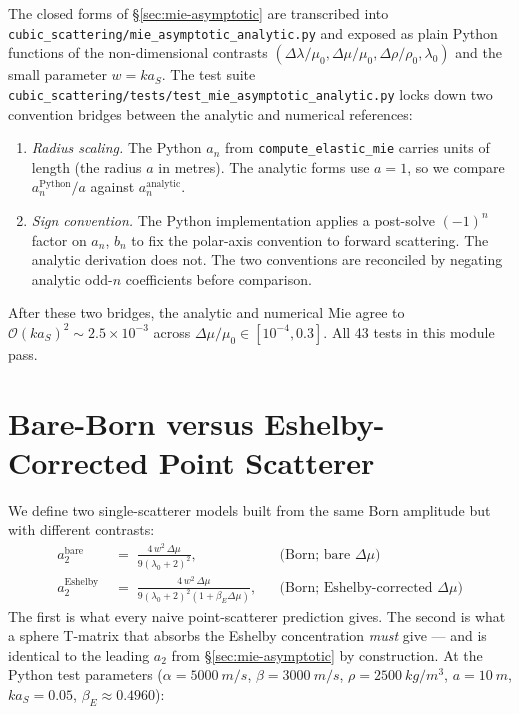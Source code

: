 \documentclass[11pt,a4paper]{article}
\newcommand{\D}{\Delta}
\newcommand{\order}{\mathcal{O}}
\newcommand{\Eshelby}{\mathrm{Eshelby}}
\newcommand{\bare}{\mathrm{bare}}
\newcommand{\code}[1]{\texttt{#1}}
\begin{document}
The closed forms of \S\ref{sec:mie-asymptotic} are transcribed into
\code{cubic\_scattering/mie\_asymptotic\_analytic.py} and exposed as
plain Python functions of the non-dimensional contrasts
$(\D\lambda/\mu_0,\D\mu/\mu_0,\D\rho/\rho_0,\lambda_0)$ and the small
parameter $w=ka_S$.  The test suite
\code{cubic\_scattering/tests/test\_mie\_asymptotic\_analytic.py}
locks down two convention bridges between the analytic and numerical
references:
\begin{enumerate}[leftmargin=*]
\item\emph{Radius scaling.}  The Python $a_n$ from
\code{compute\_elastic\_mie} carries units of length (the radius $a$ in
metres).  The analytic forms use $a=1$, so we compare
$a_n^{\mathrm{Python}}/a$ against $a_n^{\mathrm{analytic}}$.

\item\emph{Sign convention.}  The Python implementation applies a
post-solve $(-1)^n$ factor on $a_n$, $b_n$ to fix the polar-axis
convention to forward scattering.  The analytic derivation does not.
The two conventions are reconciled by negating analytic odd-$n$
coefficients before comparison.
\end{enumerate}
After these two bridges, the analytic and numerical Mie agree to
$\order{(ka_S)^2}\!\sim\!2.5\times 10^{-3}$ across $\D\mu/\mu_0\in
[10^{-4},0.3]$.  All 43 tests in this module pass.

\section{Bare-Born versus Eshelby-Corrected Point Scatterer}
\label{sec:bare-vs-eshelby}

We define two single-scatterer models built from the same Born
amplitude but with different contrasts:
\begin{align}
a_2^{\bare} &\;=\; \frac{4\,w^2\,\D\mu}{9(\lambda_0+2)^2}, &&
\text{(Born; bare $\D\mu$)} \\
a_2^{\Eshelby} &\;=\; \frac{4\,w^2\,\D\mu}{9(\lambda_0+2)^2(1+\beta_E\D\mu)}, &&
\text{(Born; Eshelby-corrected $\D\mu$)}
\end{align}
The first is what every naive point-scatterer prediction gives.  The
second is what a sphere T-matrix that absorbs the Eshelby concentration
\emph{must} give --- and is identical to the leading $a_2$ from
\S\ref{sec:mie-asymptotic} by construction.  At the Python test
parameters ($\alpha=\SI{5000}{m/s}$, $\beta=\SI{3000}{m/s}$,
$\rho=\SI{2500}{kg/m^3}$, $a=\SI{10}{m}$, $ka_S=0.05$,
$\beta_E\approx 0.4960$):
\end{document}
